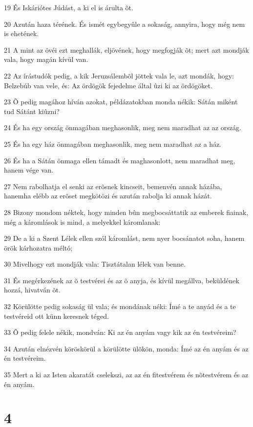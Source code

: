 \par 19 És Iskáriótes Júdást, a ki el is árulta õt.
\par 20 Azután haza térének. És ismét egybegyûle a sokaság, annyira, hogy még nem is ehetének.
\par 21 A mint az övéi ezt meghallák, eljövének, hogy megfogják õt; mert azt mondják vala, hogy magán kívül van.
\par 22 Az írástudók pedig, a kik Jeruzsálembõl jöttek vala le, azt mondák, hogy: Belzebúb van vele, és: Az ördögök fejedelme által ûzi ki az ördögöket.
\par 23 Õ pedig magához híván azokat, példázatokban monda nékik: Sátán miként tud Sátánt kiûzni?
\par 24 És ha egy ország önmagában meghasonlik, meg nem maradhat az az ország.
\par 25 És ha egy ház önmagában meghasonlik, meg nem maradhat az a ház.
\par 26 És ha a Sátán önmaga ellen támadt és maghasonlott, nem maradhat meg, hanem vége van.
\par 27 Nem rabolhatja el senki az erõsnek kincseit, bemenvén annak házába, hanemha elébb az erõset megkötözi és azután rabolja ki annak házát.
\par 28 Bizony mondom néktek, hogy minden bûn megbocsáttatik az emberek fiainak, még a káromlások is mind, a melyekkel káromlanak:
\par 29 De a ki a Szent Lélek ellen szól káromlást, nem nyer bocsánatot soha, hanem örök kárhozatra méltó;
\par 30 Mivelhogy ezt mondják vala: Tisztátalan lélek van benne.
\par 31 És megérkezének az õ testvérei és az õ anyja, és kívül megállva, beküldének hozzá, hivatván õt.
\par 32 Körülötte pedig sokaság ül vala; és mondának néki: Ímé a te anyád és a te testvéreid ott künn keresnek téged.
\par 33 Õ pedig felele nékik, mondván: Ki az én anyám vagy kik az én testvéreim?
\par 34 Azután elnézvén köröskörül a körülötte ülõkön, monda: Ímé az én anyám és az én testvéreim.
\par 35 Mert a ki az Isten akaratát cselekszi, az az én fitestvérem és nõtestvérem és az én anyám.

\chapter{4}

